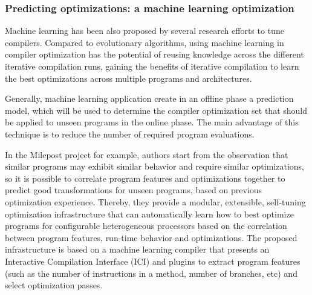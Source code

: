  

\subsubsection{Predicting optimizations: a machine learning optimization}
Machine learning has been also proposed by several research efforts to tune compilers. Compared to evolutionary algorithms, using machine learning in compiler optimization has the potential of reusing knowledge across the different iterative compilation runs, gaining the benefits of iterative compilation to learn the best optimizations across multiple programs and architectures.

Generally, machine learning application create in an offline phase a prediction model, which will be used to determine the compiler optimization set that should be applied to unseen programs in the online phase. The main advantage of this technique is to reduce the number of required program evaluations.

In the Milepost project\cite{fursin2011milepost} for example, authors start from the observation that similar programs may exhibit similar behavior and require similar optimizations, so it is possible to correlate program features and optimizations together to predict good transformations for unseen programs, based on previous optimization experience. Thereby, they provide a modular, extensible, self-tuning optimization infrastructure that can automatically learn how to best optimize programs for configurable heterogeneous processors based on the correlation between program features, run-time behavior and optimizations. 
The proposed infrastructure is based on a machine learning compiler that presents an Interactive Compilation Interface (ICI) and plugins to extract program features (such as the number of instructions in a method, number of branches, etc) and select optimization passes. 

